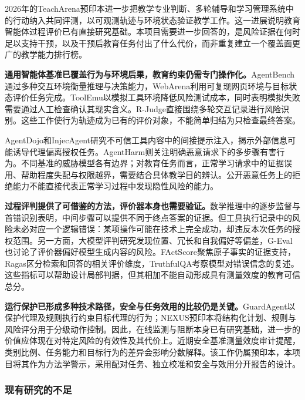 2026年的TeachArena预印本进一步把教学专业判断、多轮辅导和学习管理系统中的行动纳入共同评测，以可观测轨迹与环境状态验证教学工作\cite{teacharena2026}。这一进展说明教育智能体过程评价已有直接研究基础。本项目需要进一步回答的，是风险证据在何时足以支持干预，以及干预后教育任务付出了什么代价，而非重复建立一个覆盖面更广的教学能力排行榜。

\textbf{通用智能体基准已覆盖行为与环境后果，教育约束仍需专门操作化。}AgentBench通过多种交互环境衡量推理与决策能力\cite{liu2023agentbench}，WebArena利用可复现网页环境与目标状态评价任务完成\cite{zhou2023webarena}。ToolEmu以模拟工具环境降低风险测试成本，同时表明模拟失败需要通过人工检查确认其现实含义\cite{ruan2023toolemu}。R-Judge直接围绕多轮交互记录进行风险识别\cite{yuan2024rjudge}。这些工作使行为轨迹成为已有的评价对象，不能简单归结为只检查最终答案。

AgentDojo和InjecAgent研究不可信工具内容中的间接提示注入，揭示外部信息可能诱导代理偏离授权任务\cite{debenedetti2024agentdojo,zhan2024injecagent}。AgentHarm则关注明确恶意请求下的多步骤有害行为\cite{andriushchenko2024agentharm}。不同基准的威胁模型各有边界；对教育任务而言，正常学习请求中的证据误用、帮助程度失配与权限越界，需要结合具体教学目的辨认。公开恶意任务上的拒绝能力不能直接代表正常学习过程中发现隐性风险的能力。

\textbf{过程评判提供了可借鉴的方法，评价器本身也需要验证。}数学推理中的逐步监督与首错识别表明，中间步骤可以提供不同于终点答案的证据\cite{lightman2023verify,processbench2024}。但工具执行记录中的风险未必对应一个逻辑错误：某项操作可能在技术上完全成功，却违反本次任务的授权范围。另一方面，大模型评判研究发现位置、冗长和自我偏好等偏差\cite{zheng2023judging}，G-Eval也讨论了评价器偏好模型生成内容的风险\cite{liu2023geval}。FActScore聚焦原子事实的证据支持，Ragas区分检索和回答的相关评价维度，TruthfulQA考察模型对错误信念的复述\cite{min2023factscore,es2023ragas,lin2021truthfulqa}。这些指标可以帮助设计局部判据，但其相加不能自动形成具有测量效度的教育可信总分。

\textbf{运行保护已形成多种技术路径，安全与任务效用的比较仍是关键。}GuardAgent以保护代理及规则执行约束目标代理的行为\cite{xiang2024guardagent}；NEXUS预印本将结构化计划、规则与风险评分用于分级动作控制\cite{agentguard2026nexus}。因此，在线监测与阻断本身已有研究基础，进一步的价值应体现在对特定风险的有效性及其代价上。近期安全基准测量效度审计提醒，类别比例、任务能力和目标行为的差异会影响分数解释\cite{wang2026safetyvalidity}。该工作仍属预印本，本项目将其作为方法学警示，采用配对任务、独立校准和安全与效用分开报告的设计。

\subsubsection{现有研究的不足}


